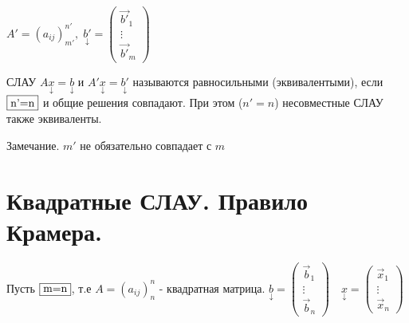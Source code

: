 \documentclass[../main.tex]{subfiles}
\begin{document}
$A' = (a_{ij})_{m'}^{n'}, \; \underset{\downarrow}{b'}=\begin{pmatrix} \vec{b'}_{1}\\ \vdots\\ \vec{b'}_{m} \end{pmatrix}$
\begin{definition}
    СЛАУ $A \underset{\downarrow}{x}=\underset{\downarrow}{b}$ и $A'\underset{\downarrow}{x}=\underset{\downarrow}{b'}$ называются равносильными (эквивалентыми), если $\fbox{n'=n}$ и общие решения совпадают. При этом ($n'=n$) несовместные СЛАУ также эквиваленты.
\end{definition} 
\noindent Замечание. $m'$ не обязательно совпадает с $m$
\section{Квадратные СЛАУ. Правило Крамера.}
Пусть $\fbox{m=n}$, т.е $A=(a_{ij})_{n}^{n}$ - квадратная матрица. $\underset{\downarrow}{b}=\begin{pmatrix} \vec{b}_{1}\\ \vdots\\ \vec{b}_{n} \end{pmatrix}\quad \underset{\downarrow}{x}=\begin{pmatrix} \vec{x}_{1}\\ \vdots\\ \vec{x}_{n} \end{pmatrix}$
\end{document}
